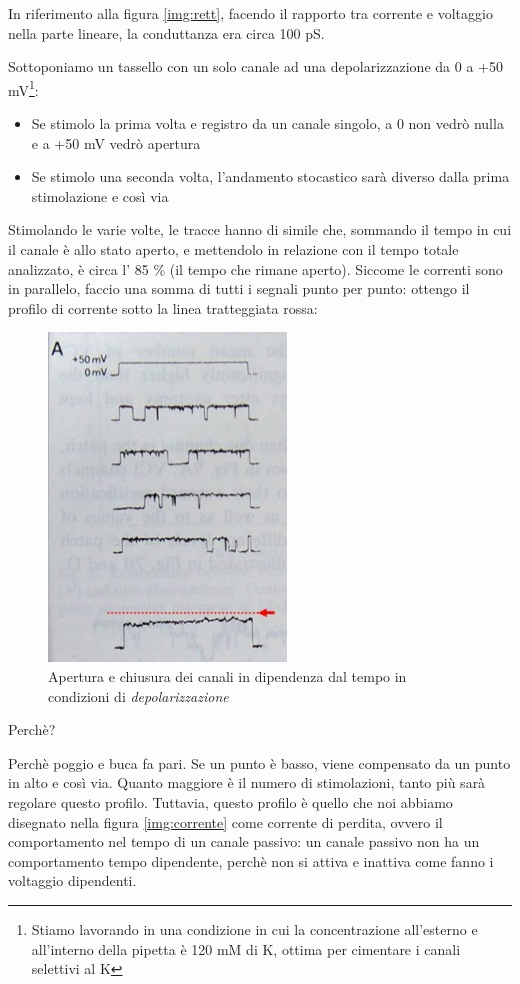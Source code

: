 \documentclass[a4paper,12pt]{article}
\begin{document}
In riferimento alla figura \ref{img:rett}, facendo il rapporto tra corrente e voltaggio nella parte lineare, la conduttanza era circa 100 pS.

Sottoponiamo un tassello con un solo canale ad una depolarizzazione da 0 a +50 mV\footnote{Stiamo lavorando in una condizione in cui la concentrazione all'esterno e all'interno della pipetta è 120 mM di K, ottima per cimentare i canali selettivi al K}:
\begin{itemize}
\item{Se stimolo la prima volta e registro da un canale singolo, a 0 non vedrò nulla e a +50 mV vedrò apertura} 
\item{Se stimolo una seconda volta, l'andamento stocastico sarà diverso dalla prima stimolazione e così via}
\end{itemize}
Stimolando le varie volte, le tracce hanno di simile che, sommando il tempo in cui il canale è allo stato aperto, e mettendolo in relazione con il tempo totale analizzato, è circa l' 85 \% (il tempo che rimane aperto). Siccome le correnti sono in parallelo, faccio una somma di tutti i segnali punto per punto: ottengo il profilo di corrente sotto la linea tratteggiata rossa:

\begin{figure}[H]
\centering
\includegraphics[scale=0.4]{immagine/tempo_d.jpg}
\caption{Apertura e chiusura dei canali in dipendenza dal tempo in condizioni di \emph{depolarizzazione}}
\label{img:a}
\end{figure} 

Perchè?

Perchè poggio e buca fa pari. Se un punto è basso, viene compensato da un punto in alto e così via. Quanto maggiore è il numero di stimolazioni, tanto più sarà regolare questo profilo. Tuttavia, questo profilo è quello che noi abbiamo disegnato nella figura \ref{img:corrente} come corrente di perdita, ovvero il comportamento nel tempo di un canale passivo: un canale passivo non ha un comportamento tempo dipendente, perchè non si attiva e inattiva come fanno i voltaggio dipendenti.
\end{document}
